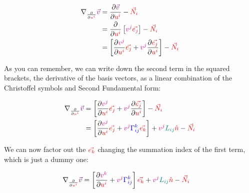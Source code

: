 \begin{align*}
    \nabla_{\frac{\partial}{\partial \begingroup\color{red}u^i\endgroup}}\begingroup\color{violet}\vec{v}\endgroup &= \frac{\partial \begingroup\color{violet}\vec{v}\endgroup}{\partial \begingroup\color{red}u^i\endgroup} - \begingroup\color{red}\vec{N}_i\endgroup\\
    &= \frac{\partial}{\partial \begingroup\color{red}u^i\endgroup} \left[\begingroup\color{magenta}v^j\endgroup \begingroup\color{red}\vec{e_j}\endgroup\right] - \begingroup\color{red}\vec{N}_i\endgroup\\
    &= \left[\frac{\partial \begingroup\color{magenta}v^j\endgroup}{\partial \begingroup\color{red}u^i\endgroup} \begingroup\color{red}\vec{e_j}\endgroup + \begingroup\color{magenta}v^j\endgroup \frac{\partial \begingroup\color{red}\vec{e_j}\endgroup}{\partial \begingroup\color{red}u^i\endgroup} \right] - \begingroup\color{red}\vec{N}_i\endgroup
\end{align*}

As you can remember, we can write down the second term in the squared brackets, the derivative of the basis vectors, as a linear combination of the Christoffel symbols and Second Fundamental form:

\begin{align*}
    \nabla_{\frac{\partial}{\partial \begingroup\color{red}u^i\endgroup}}\begingroup\color{violet}\vec{v}\endgroup &= \left[\frac{\partial \begingroup\color{magenta}v^j\endgroup}{\partial \begingroup\color{red}u^i\endgroup} \begingroup\color{red}\vec{e_j}\endgroup + \begingroup\color{magenta}v^j\endgroup \frac{\partial \begingroup\color{red}\vec{e_j}\endgroup}{\partial \begingroup\color{red}u^i\endgroup} \right] - \begingroup\color{red}\vec{N}_i\endgroup\\
    &= \left[\frac{\partial \begingroup\color{magenta}v^j\endgroup}{\partial \begingroup\color{red}u^i\endgroup} \begingroup\color{red}\vec{e_j}\endgroup + \begingroup\color{magenta}v^j\endgroup \begingroup\color{blue}\Gamma^{k}_{ij}\endgroup \begingroup\color{red}\vec{e_k}\endgroup \right] + \begingroup\color{magenta}v^j\endgroup \begingroup\color{teal}L_{ij}\endgroup\begingroup\color{red}\hat{n}\endgroup - \begingroup\color{red}\vec{N}_i\endgroup
\end{align*}

We can now factor out the $\color{red}\vec{e_k}$ changing the summation index of the first term, which is just a dummy one:

\begin{align*}
    \nabla_{\frac{\partial}{\partial \begingroup\color{red}u^i\endgroup}}\begingroup\color{violet}\vec{v}\endgroup
    &= \left[\frac{\partial \begingroup\color{magenta}v^k\endgroup}{\partial \begingroup\color{red}u^i\endgroup} + \begingroup\color{magenta}v^j\endgroup \begingroup\color{blue}\Gamma^{k}_{ij}\endgroup \right]\begingroup\color{red}\vec{e_k}\endgroup + \begingroup\color{magenta}v^j\endgroup \begingroup\color{teal}L_{ij}\endgroup\begingroup\color{red}\hat{n}\endgroup - \begingroup\color{red}\vec{N}_i\endgroup
\end{align*}

